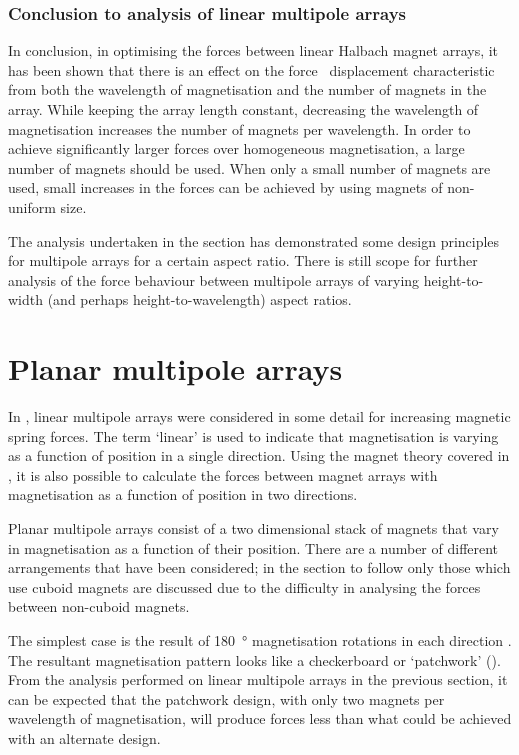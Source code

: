 \documentclass[11pt,a4paper]{memoir}
\begin{document}
\subsubsection{Conclusion to analysis of linear multipole arrays}

In conclusion, in optimising the forces between linear Halbach magnet arrays, it has been shown that there is an effect on the force \vs\ displacement characteristic from both the wavelength of magnetisation and the number of magnets in the array.
While keeping the array length constant, decreasing the wavelength of magnetisation increases the number of magnets per wavelength.
In order to achieve significantly larger forces over homogeneous magnetisation, a large number of magnets should be used.
When only a small number of magnets are used, small increases in the forces can be achieved by using magnets of non-uniform size.

The analysis undertaken in the section has demonstrated some design principles for multipole arrays for a certain aspect ratio.
There is still scope for further analysis of the force behaviour between multipole arrays of varying height-to-width (and perhaps height-to-wavelength) aspect ratios.


\section{Planar multipole arrays}

In , linear multipole arrays were considered in some detail for increasing magnetic spring forces.
The term `linear' is used to indicate that magnetisation is varying as a function of position in a single direction.
Using the magnet theory covered in , it is also possible to calculate the forces between magnet arrays with magnetisation as a function of position in two directions.

Planar multipole arrays consist of a two dimensional stack of magnets that vary in magnetisation as a function of their position.
There are a number of different arrangements that have been considered; in the section to follow only those which use cuboid magnets are discussed due to the difficulty in analysing the forces between non-cuboid magnets.

The simplest case is the result of \SI{180}{\degree} magnetisation rotations in each direction \cite{kim1997-thesis,cho2001}.
The resultant magnetisation pattern looks like a checkerboard or `patchwork' ().
From the analysis performed on linear multipole arrays in the previous section, it can be expected that the patchwork design, with only two magnets per wavelength of magnetisation, will produce forces less than what could be achieved with an alternate design.
\end{document}
